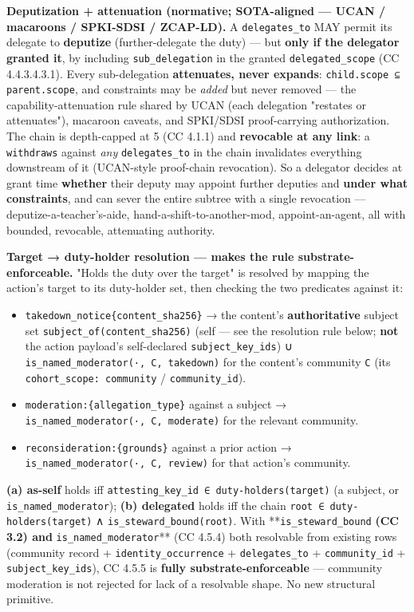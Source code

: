 \documentclass[11pt]{article}
\begin{document}
\textbf{Deputization + attenuation (normative; SOTA-aligned — UCAN / macaroons / SPKI-SDSI / ZCAP-LD).} A \texttt{delegates\_to} MAY permit its delegate to \textbf{deputize} (further-delegate the duty) — but \textbf{only if the delegator granted it}, by including \texttt{sub\_delegation} in the granted \texttt{delegated\_scope} (CC 4.4.3.4.3.1). Every sub-delegation \textbf{attenuates, never expands}: \texttt{child.scope ⊆ parent.scope}, and constraints may be \textit{added} but never removed — the capability-attenuation rule shared by UCAN (each delegation "restates or attenuates"), macaroon caveats, and SPKI/SDSI proof-carrying authorization. The chain is depth-capped at 5 (CC 4.1.1) and \textbf{revocable at any link}: a \texttt{withdraws} against \textit{any} \texttt{delegates\_to} in the chain invalidates everything downstream of it (UCAN-style proof-chain revocation). So a delegator decides at grant time \textbf{whether} their deputy may appoint further deputies and \textbf{under what constraints}, and can sever the entire subtree with a single revocation — deputize-a-teacher's-aide, hand-a-shift-to-another-mod, appoint-an-agent, all with bounded, revocable, attenuating authority.


\textbf{Target → duty-holder resolution — makes the rule substrate-enforceable.} "Holds the duty over the target" is resolved by mapping the action's target to its duty-holder set, then checking the two predicates against it:


\begin{itemize}\setlength\itemsep{0pt}
\item \texttt{takedown\_notice\{content\_sha256\}} → the content's \textbf{authoritative} subject set \texttt{subject\_of(content\_sha256)} (self — see the resolution rule below; \textbf{not} the action payload's self-declared \texttt{subject\_key\_ids}) ∪ \texttt{is\_named\_moderator(·, C, takedown)} for the content's community \texttt{C} (its \texttt{cohort\_scope: community} / \texttt{community\_id}).
\item \texttt{moderation:\{allegation\_type\}} against a subject → \texttt{is\_named\_moderator(·, C, moderate)} for the relevant community.
\item \texttt{reconsideration:\{grounds\}} against a prior action → \texttt{is\_named\_moderator(·, C, review)} for that action's community.
\end{itemize}


\textbf{(a) as-self} holds iff \texttt{attesting\_key\_id ∈ duty-holders(target)} (a subject, or \texttt{is\_named\_moderator}); \textbf{(b) delegated} holds iff the chain \texttt{root ∈ duty-holders(target)} ∧ \texttt{is\_steward\_bound(root)}. With **\texttt{is\_steward\_bound}\textbf{ (CC 3.2) and }\texttt{is\_named\_moderator}** (CC 4.5.4) both resolvable from existing rows (community record + \texttt{identity\_occurrence} + \texttt{delegates\_to} + \texttt{community\_id} + \texttt{subject\_key\_ids}), CC 4.5.5 is \textbf{fully substrate-enforceable} — community moderation is not rejected for lack of a resolvable shape. No new structural primitive.
\end{document}
